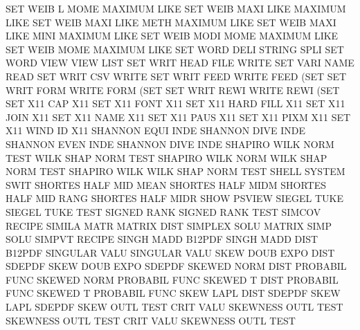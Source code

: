 SET      WEIB L    MOME                 MAXIMUM  LIKE
SET      WEIB MAXI LIKE                 MAXIMUM  LIKE
SET      WEIB MAXI LIKE METH            MAXIMUM  LIKE
SET      WEIB MAXI LIKE MINI            MAXIMUM  LIKE
SET      WEIB MODI MOME                 MAXIMUM  LIKE
SET      WEIB MOME                      MAXIMUM  LIKE
SET      WORD DELI                      STRING   SPLI
SET      WORD VIEW VIEW                 LIST
SET      WRIT HEAD FILE                 WRITE
SET      VARI NAME                      READ
SET      WRIT CSV                       WRITE
SET      WRIT FEED                      WRITE    FEED (SET
SET      WRIT FORM                      WRITE    FORM (SET
SET      WRIT REWI                      WRITE    REWI (SET
SET      X11  CAP                       X11
SET      X11  FONT                      X11
SET      X11  HARD FILL                 X11
SET      X11  JOIN                      X11
SET      X11  NAME                      X11
SET      X11  PAUS                      X11
SET      X11  PIXM                      X11
SET      X11  WIND ID                   X11
SHANNON  EQUI INDE                      SHANNON  DIVE INDE
SHANNON  EVEN INDE                      SHANNON  DIVE INDE
SHAPIRO  WILK NORM TEST                 WILK     SHAP NORM TEST
SHAPIRO  WILK NORM                      WILK     SHAP NORM TEST
SHAPIRO  WILK                           WILK     SHAP NORM TEST
SHELL                                   SYSTEM   SWIT
SHORTES  HALF MID  MEAN                 SHORTES  HALF MIDM
SHORTES  HALF MID  RANG                 SHORTES  HALF MIDR
SHOW                                    PSVIEW
SIEGEL   TUKE                           SIEGEL   TUKE TEST
SIGNED   RANK                           SIGNED   RANK TEST
SIMCOV                                  RECIPE
SIMILA   MATR                           MATRIX   DIST
SIMPLEX  SOLU                           MATRIX   SIMP SOLU
SIMPVT                                  RECIPE
SINGH    MADD                           B12PDF
SINGH    MADD DIST                      B12PDF
SINGULAR VALU                           SINGULAR VALU
SKEW     DOUB EXPO DIST                 SDEPDF
SKEW     DOUB EXPO                      SDEPDF
SKEWED   NORM DIST                      PROBABIL FUNC
SKEWED   NORM                           PROBABIL FUNC
SKEWED   T    DIST                      PROBABIL FUNC
SKEWED   T                              PROBABIL FUNC
SKEW     LAPL DIST                      SDEPDF
SKEW     LAPL                           SDEPDF
SKEW     OUTL TEST CRIT VALU            SKEWNESS OUTL TEST
SKEWNESS OUTL TEST CRIT VALU            SKEWNESS OUTL TEST
